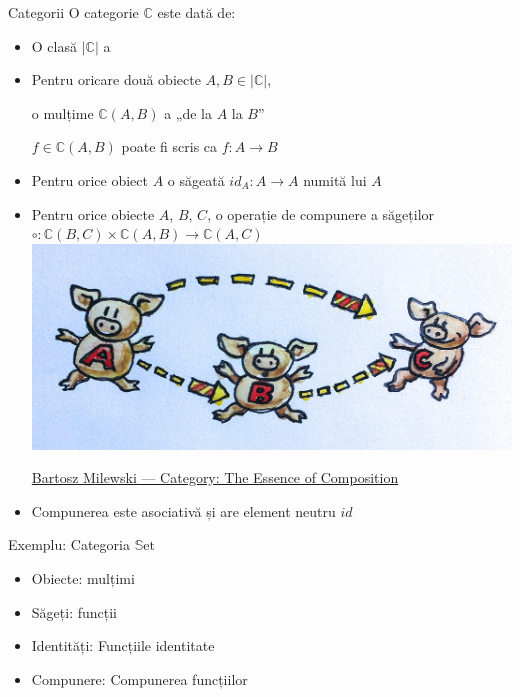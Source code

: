 \documentclass[xcolor=pdftex,romanian,colorlinks]{beamer}
\begin{document}
\begin{frame}[fragile]{Categorii}
O categorie $\mathbb{C}$ este dată de:
\begin{itemize}
\item O clasă $|\mathbb{C}|$ a  
\item Pentru oricare două obiecte $A, B \in |\mathbb{C}|$, 

o mulțime $\mathbb{C}(A,B)$ a  „de la $A$ la $B$”

$f\in \mathbb{C}(A,B)$ poate fi scris ca $f : A \rightarrow B$ 
\item Pentru orice obiect $A$ o săgeată $\mathit{id}_A : A \rightarrow A$ numită  lui $A$
\item Pentru orice obiecte $A$, $B$, $C$, o operație de compunere a săgeților
$\circ : \mathbb{C}(B,C) \times \mathbb{C}(A,B) \rightarrow \mathbb{C}(A,C)$
\includegraphics[scale=.1]{category}
\hfill \parbox[b]{.3\columnwidth}{\href{https://bartoszmilewski.com/2014/11/04/category-the-essence-of-composition/}{Bartosz Milewski --- Category: The Essence of Composition}}

\item Compunerea este asociativă și are element neutru $\textit{id}$
\end{itemize}
\end{frame}


\begin{frame}{Exemplu: Categoria $\mathrm{\mathbb{S}et}$}
\begin{itemize}
\item Obiecte: mulțimi
\item Săgeți: funcții
\item Identități:  Funcțiile identitate
\item Compunere: Compunerea funcțiilor
\end{itemize}

\end{frame}
\end{document}
